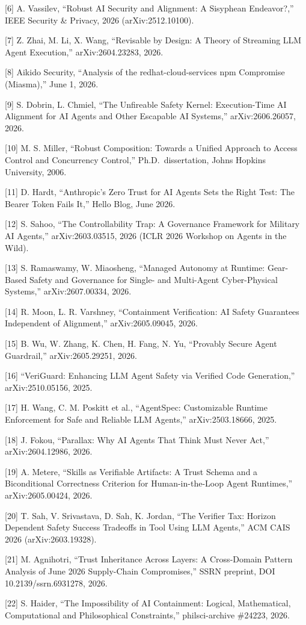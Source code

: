 \documentclass[
  11pt,
]{article}
\begin{document}
{[}6{]} A. Vassilev, ``Robust AI Security and Alignment: A Sisyphean
Endeavor?,'' IEEE Security \& Privacy, 2026 (arXiv:2512.10100).

{[}7{]} Z. Zhai, M. Li, X. Wang, ``Revisable by Design: A Theory of
Streaming LLM Agent Execution,'' arXiv:2604.23283, 2026.

{[}8{]} Aikido Security, ``Analysis of the redhat-cloud-services npm
Compromise (Miasma),'' June 1, 2026.

{[}9{]} S. Dobrin, L. Chmiel, ``The Unfireable Safety Kernel:
Execution-Time AI Alignment for AI Agents and Other Escapable AI
Systems,'' arXiv:2606.26057, 2026.

{[}10{]} M. S. Miller, ``Robust Composition: Towards a Unified Approach
to Access Control and Concurrency Control,'' Ph.D.~dissertation, Johns
Hopkins University, 2006.

{[}11{]} D. Hardt, ``Anthropic's Zero Trust for AI Agents Sets the Right
Test: The Bearer Token Fails It,'' Hello Blog, June 2026.

{[}12{]} S. Sahoo, ``The Controllability Trap: A Governance Framework
for Military AI Agents,'' arXiv:2603.03515, 2026 (ICLR 2026 Workshop on
Agents in the Wild).

{[}13{]} S. Ramaswamy, W. Miaosheng, ``Managed Autonomy at Runtime:
Gear-Based Safety and Governance for Single- and Multi-Agent
Cyber-Physical Systems,'' arXiv:2607.00334, 2026.

{[}14{]} R. Moon, L. R. Varshney, ``Containment Verification: AI Safety
Guarantees Independent of Alignment,'' arXiv:2605.09045, 2026.

{[}15{]} B. Wu, W. Zhang, K. Chen, H. Fang, N. Yu, ``Provably Secure
Agent Guardrail,'' arXiv:2605.29251, 2026.

{[}16{]} ``VeriGuard: Enhancing LLM Agent Safety via Verified Code
Generation,'' arXiv:2510.05156, 2025.

{[}17{]} H. Wang, C. M. Poskitt et al., ``AgentSpec: Customizable
Runtime Enforcement for Safe and Reliable LLM Agents,''
arXiv:2503.18666, 2025.

{[}18{]} J. Fokou, ``Parallax: Why AI Agents That Think Must Never
Act,'' arXiv:2604.12986, 2026.

{[}19{]} A. Metere, ``Skills as Verifiable Artifacts: A Trust Schema and
a Biconditional Correctness Criterion for Human-in-the-Loop Agent
Runtimes,'' arXiv:2605.00424, 2026.

{[}20{]} T. Sah, V. Srivastava, D. Sah, K. Jordan, ``The Verifier Tax:
Horizon Dependent Safety Success Tradeoffs in Tool Using LLM Agents,''
ACM CAIS 2026 (arXiv:2603.19328).

{[}21{]} M. Agnihotri, ``Trust Inheritance Across Layers: A Cross-Domain
Pattern Analysis of June 2026 Supply-Chain Compromises,'' SSRN preprint,
DOI 10.2139/ssrn.6931278, 2026.

{[}22{]} S. Haider, ``The Impossibility of AI Containment: Logical,
Mathematical, Computational and Philosophical Constraints,''
philsci-archive \#24223, 2026.
\end{document}
